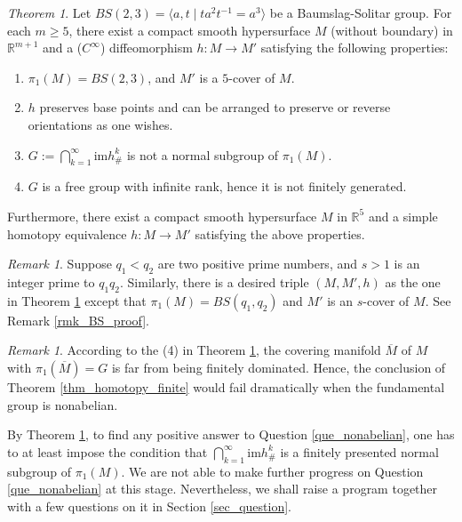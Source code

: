 \documentclass[12pt]{amsart}
\theoremstyle{plain}
\theoremstyle{definition}
\theoremstyle{question}
\theoremstyle{remark}
\newtheorem{remark}[theorem]{Remark}
\theoremstyle{assumption}
\numberwithin{equation}{section}
\theoremstyle{bigthm}
\newtheorem{bigthm}{Theorem}
\begin{document}
\begin{bigthm}\label{thm_BS_manifold}
Let $BS(2,3) = \langle a,t \mid t a^{2} t^{-1} = a^{3} \rangle$ be a Baumslag-Solitar group. For each $m \geq 5$, there exist a compact smooth hypersurface $M$ (without boundary) in $\mathbb{R}^{m+1}$ and a ($C^{\infty}$) diffeomorphism $h \colon  M \rightarrow M'$ satisfying the following properties:
\begin{enumerate}
\item $\pi_{1} (M) = BS(2,3)$, and $M'$ is a $5$-cover of $M$.

\item $h$ preserves base points and can be arranged to preserve or reverse orientations as one wishes.

\item $G := \bigcap_{k=1}^{\infty} \mathrm{im} h_{\#}^{k}$ is not a normal subgroup of $\pi_{1} (M)$.

\item $G$ is a free group with infinite rank, hence it is not finitely generated.
\end{enumerate}

Furthermore, there exist a compact smooth hypersurface $M$ in $\mathbb{R}^{5}$ and a simple homotopy equivalence $h \colon  M \rightarrow M'$ satisfying the above properties.
\end{bigthm}

\begin{remark}\label{rmk_BS_general}
Suppose $q_{1} < q_{2}$ are two positive prime numbers, and $s>1$ is an integer prime to $q_{1} q_{2}$. Similarly, there is a desired triple $(M, M', h)$ as the one in Theorem \ref{thm_BS_manifold} except that $\pi_{1} (M) = BS(q_{1}, q_{2})$ and $M'$ is an $s$-cover of $M$. See Remark \ref{rmk_BS_proof}.
\end{remark}

\begin{remark}\label{rmk_BS_nonfinite}
According to the (4) in Theorem \ref{thm_BS_manifold}, the covering manifold $\overline{M}$ of $M$ with $\pi_{1} (\overline{M}) =G$ is far from being finitely dominated. Hence, the conclusion of Theorem \ref{thm_homotopy_finite} would fail dramatically when the fundamental group is nonabelian.
\end{remark}

By Theorem \ref{thm_BS_manifold}, to find any positive answer to Question \ref{que_nonabelian}, one has to at least impose the condition that $\bigcap_{k=1}^{\infty} \mathrm{im} h_{\#}^{k}$ is a finitely presented normal subgroup of $\pi_{1} (M)$. We are not able to make further progress on Question \ref{que_nonabelian} at this stage. Nevertheless, we shall raise a program together with a few questions on it in Section \ref{sec_question}.
\end{document}
